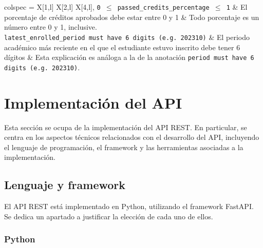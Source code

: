 \begin{longtblr}[
		caption = {Anotaciones del diagrama de clases y su significado},
		label = {tab:anotaciones},
	]{
		colspec = {X[1,l] X[2,l] X[4,l]},
	}
	\texttt{0 \ensuremath{\leq} passed\_credits\_percentage \ensuremath{\leq} 1} & El porcentaje de créditos aprobados debe estar entre 0 y 1                                                                 & Todo porcentaje es un número entre 0 y 1, inclusive.                                                                                                                                                                                                               \\
	\texttt{latest\_enrolled\_period must have 6 digits (e.g. 202310)}           & El periodo académico más reciente en el que el estudiante estuvo inscrito debe tener 6 dígitos                             & Esta explicación es análoga a la de la anotación \lstinline|period must have 6 digits (e.g. 202310)|.                                                                                                                                                              \\
	\hline
\end{longtblr}

\section{Implementación del API}

Esta sección se ocupa de la implementación del \gls{API REST}. En particular, se centra en los aspectos técnicos relacionados con el desarrollo del \gls{API}, incluyendo el lenguaje de programación, el framework y las herramientas asociadas a la implementación.

\subsection{Lenguaje y framework}

El \gls{API REST} está implementado en \gls{Python}, utilizando el framework \gls{FastAPI}. Se dedica un apartado a justificar la elección de cada uno de ellos.

\subsubsection{Python}

